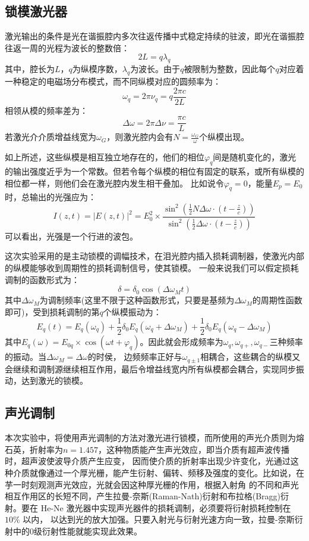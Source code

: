 \documentclass[font=default]{mpltx}
\begin{document}
\subsection{锁模激光器}
激光输出的条件是光在谐振腔内多次往返传播中式稳定持续的驻波，即光在谐振腔往返一周的光程为波长的整数倍：
$$2L=q\lambda_q$$
其中，腔长为$L$，$q$为纵模序数，$\lambda_q$为波长。由于$q$被限制为整数，因此每个$q$对应着一种稳定的电磁场分布模式，而不同纵模对应的圆频率为：
$$\omega_q=2\pi\nu_q=q\frac{2\pi c}{2L}$$
相领从模的频率差为：
$$\Delta \omega= 2\pi \Delta \nu = \frac{\pi c}{L}$$
若激光介介质增益线宽为$\omega_G$，则激光腔内会有$N=\frac{\omega_G}{\omega}$个纵模出现。\par

如上所述，这些纵模是相互独立地存在的，他们的相位$\varphi_q$间是随机变化的，激光的输出强度近乎为一个常数。但若令每个纵模的相位有固定的联系，或所有纵模的相位都一样，则他们会在激光腔内发生相干叠加。
比如说令$\varphi_q=0$，能量$E_p=E_0$时，总输出的光强应为：
$$I(z,t)=|E(z,t)|^2=E_0^2\times\frac{\sin^2(\frac{1}{2}N\Delta\omega\cdot(t-\frac{z}{c}))}{\sin^2(\frac{1}{2}\Delta\omega\cdot(t-\frac{z}{c}))}$$
可以看出，光强是一个行进的波包。\par

这次实验采用的是主动锁模的调幅技术，在泪光腔内插入损耗调制器，使激光内部的纵模能够收到周期性的损耗调制信号，使其锁模。
一般来说我们可以假定损耗调制的函数形式为：
$$\delta=\delta_0\cos(\Delta\omega_Mt)$$
其中$\Delta\omega_M$为调制频率(这里不限于这种函数形式，只要是基频为$\Delta \omega_M$的周期性函数即可)，受到损耗调制的第$q$个纵模振动为：
$$E_q(t) =  E_{q}(\omega_q) + \frac{1}{2}\delta_0 E_{q}(\omega_q+\Delta\omega_M) +\frac{1}{2}\delta_0E_{q}(\omega_q-\Delta\omega_M)$$
其中$E_{q}(\omega)=E_{0q}\times\cos{(\omega t + \varphi_q)}$。因此就会形成频率为$\omega_q,\omega_{q+},\omega_{q-}$三种频率的振动。当$\Delta\omega_M=\Delta\omega$的时侯，
边频频率正好与$\omega_{q\pm1}$相耦合，这些耦合的纵模又会继续和调制源继续相互作用，最后令增益线宽内所有纵模都会耦合，实现同步振动，达到激光的锁模。

\subsection{声光调制}
本次实验中，将使用声光调制的方法对激光进行锁模，而所使用的声光介质则为熔石英，折射率为$n=1.457$，这种物质能产生声光效应，即当介质有超声波传播时，超声波使波导介质产生应变，
因而使介质的折射率出现少许变化，光通过这种介质就像通过一个厚光栅，能产生衍射、偏转、频移及强度的变化。比如说，在芋一时刻观测声光效应，光就会因这种厚光栅的作用，根据入射角
的不同和声光相互作用区的长短不同，产生拉曼-奈斯(Raman-Nath)衍射和布拉格(Bragg)衍射。要在 He-Ne 激光器中实现声光器件的损耗调制，必须要将衍射损耗控制在 $10\%$ 以内，
以达到光的放大加强。只要入射光与衍射光速方向一致，拉曼-奈斯衍射中的0级衍射性能就能实现此效果。
\end{document}
